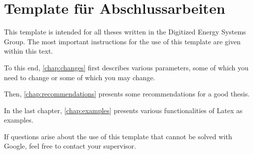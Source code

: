 \chapter{Template für Abschlussarbeiten}
\label{chap:template}

This template is intended for all theses written in the Digitized Energy Systems Group. The most important instructions for the use of this template are given within this text.

To this end, \autoref{chap:changes} first describes various parameters, some of which you need to change or some of which you may change.

Then, \autoref{chap:recommendations} presents some recommendations for a good thesis.

In the last chapter, \autoref{chap:examples} presents various functionalities of Latex as examples.

If questions arise about the use of this template that cannot be solved with Google, feel free to contact your supervisor.